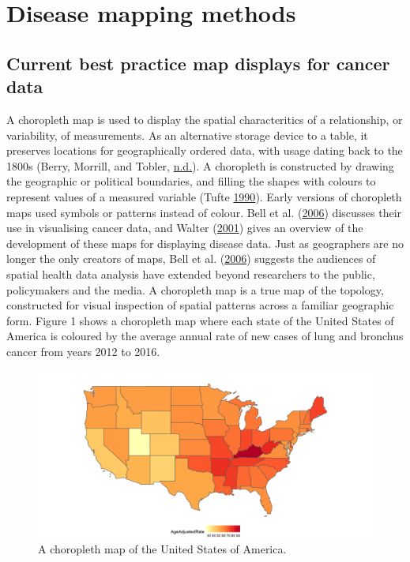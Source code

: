 \documentclass[11pt,]{article}
\begin{document}
\hypertarget{disease-mapping-methods}{%
\section{Disease mapping methods}\label{disease-mapping-methods}}

\hypertarget{current-best-practice-map-displays-for-cancer-data}{%
\subsection{Current best practice map displays for cancer
data}\label{current-best-practice-map-displays-for-cancer-data}}

A choropleth map is used to display the spatial characteritics of a
relationship, or variability, of measurements. As an alternative storage
device to a table, it preserves locations for geographically ordered
data, with usage dating back to the 1800s (Berry, Morrill, and Tobler,
\protect\hyperlink{ref-GOINO}{n.d.}). A choropleth is constructed by
drawing the geographic or political boundaries, and filling the shapes
with colours to represent values of a measured variable (Tufte
\protect\hyperlink{ref-EI}{1990}). Early versions of choropleth maps
used symbols or patterns instead of colour. Bell et al.
(\protect\hyperlink{ref-CPISACA}{2006}) discusses their use in
visualising cancer data, and Walter
(\protect\hyperlink{ref-DMAHP}{2001}) gives an overview of the
development of these maps for displaying disease data. Just as
geographers are no longer the only creators of maps, Bell et al.
(\protect\hyperlink{ref-CPISACA}{2006}) suggests the audiences of
spatial health data analysis have extended beyond researchers to the
public, policymakers and the media. A choropleth map is a true map of
the topology, constructed for visual inspection of spatial patterns
across a familiar geographic form. Figure 1 shows a choropleth map where
each state of the United States of America is coloured by the average
annual rate of new cases of lung and bronchus cancer from years 2012 to
2016.

\begin{figure}

{\centering \includegraphics[width=0.8\linewidth]{figures/ggchoro} 

}

\caption{A choropleth map of the United States of America.}\label{fig:choro}
\end{figure}
\end{document}
